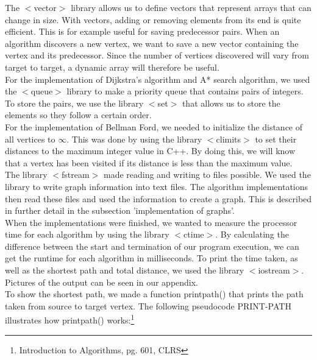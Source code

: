 \documentclass[11pt]{article}
\begin{document}
\noindent The $<$vector$>$ library allows us to define vectors that represent arrays that can change in size. With vectors, adding or removing elements from its end is quite efficient. This is for example useful for saving predecessor pairs. When an algorithm discovers a new vertex, we want to save a new vector containing the vertex and its predecessor. Since the number of vertices discovered will vary from target to target, a dynamic array will therefore be useful.\\

\noindent For the implementation of Dijkstra's algorithm and A* search algorithm, we used the $<$queue$>$ library to make a priority queue that contains pairs of integers. To store the pairs, we use the library $<$set$>$ that allows us to store the elements so they follow a certain order.\\

\noindent For the implementation of Bellman Ford, we needed to initialize the distance of all vertices to $\infty$. This was done by using the library $<$climits$>$ to set their distances to the maximum integer value in C++. By doing this, we will know that a vertex has been visited if its distance is less than the maximum value.\\

\noindent The library $<$fstream$>$ made reading and writing to files possible. We used the library to write graph information into text files. The algorithm implementations then read these files and used the information to create a graph. This is described in further detail in the subsection 'implementation of graphs'.\\

\noindent When the implementations were finished, we wanted to measure the processor time for each algorithm by using the library $<$ctime$>$. By calculating the difference between the start and termination of our program execution, we can get the runtime for each algorithm in milliseconds. To print the time taken, as well as the shortest path and total distance, we used the library $<$iostream$>$. Pictures of the output can be seen in our appendix.\\

\noindent To show the shortest path, we made a function print\textunderscore path() that prints the path taken from source to target vertex. The following pseudocode PRINT-PATH illustrates how print\textunderscore path() works:\footnote{Introduction to Algorithms, pg. 601, CLRS}
\end{document}
